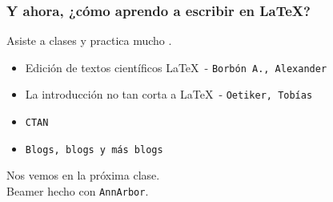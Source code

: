 \documentclass[11pt]{beamer}
\begin{document}
\begin{frame}
\frametitle{Y ahora, ¿cómo aprendo a escribir en \LaTeX?}
Asiste a clases y practica mucho \Ninja[1.5][green!50][blue].\\ 
\begin{itemize}
\item Edición de textos científicos \LaTeX \, - \texttt{Borbón A., Alexander}
\item La introducción no tan corta a \LaTeX \, - \texttt{Oetiker, Tobías}
\item \texttt{CTAN}
\item \texttt{Blogs, blogs y más blogs}
\end{itemize}
\vfill
Nos vemos en la próxima clase.\\[70pt]
Beamer hecho con \texttt{AnnArbor}.
\end{frame}
\end{document}
